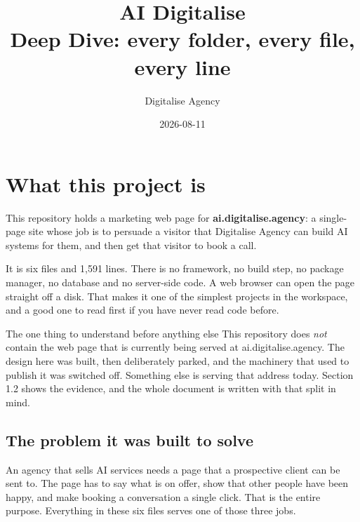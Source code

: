 \documentclass[11pt,a4paper]{article}
\title{AI Digitalise\\[2mm]\large Deep Dive: every folder, every file, every line}
\author{Digitalise Agency}
\date{2026-08-11}
\begin{document}
\maketitle
\tableofcontents
\newpage

\section{What this project is}

This repository holds a marketing web page for \textbf{ai.digitalise.agency}: a
single-page site whose job is to persuade a visitor that Digitalise Agency can
build AI systems for them, and then get that visitor to book a call.

It is six files and 1{,}591 lines. There is no framework, no build step, no
package manager, no database and no server-side code. A web browser can open
the page straight off a disk. That makes it one of the simplest projects in the
workspace, and a good one to read first if you have never read code before.

\begin{keyidea}{The one thing to understand before anything else}
This repository does \emph{not} contain the web page that is currently being
served at ai.digitalise.agency. The design here was built, then deliberately
parked, and the machinery that used to publish it was switched off. Something
else is serving that address today. Section 1.2 shows the evidence, and the
whole document is written with that split in mind.
\end{keyidea}

\subsection{The problem it was built to solve}

An agency that sells AI services needs a page that a prospective client can be
sent to. The page has to say what is on offer, show that other people have been
happy, and make booking a conversation a single click. That is the entire
purpose. Everything in these six files serves one of those three jobs.
\end{document}

